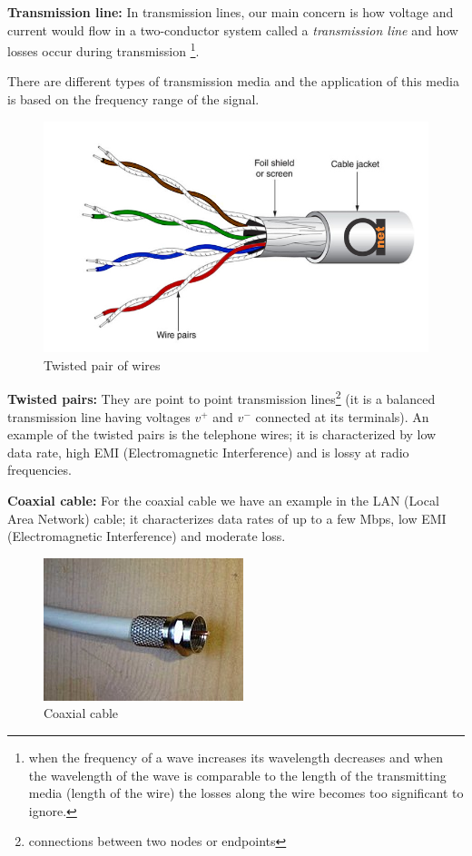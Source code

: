\textbf{Transmission line:} In transmission lines, our main concern is how voltage and current would flow in a two-conductor system called a \textit{transmission line} and how losses occur during transmission \footnote{when the frequency of a wave increases its wavelength decreases and when the wavelength of the wave is comparable to the length of the transmitting media (length of the wire) the losses along the wire becomes too significant to ignore.}.

There are different types of transmission media and the application of this media is based on the frequency range of the signal. \begin{figure}[h]
\centering
\includegraphics[width=1\linewidth]{./graphics/twistedpairs}
\caption{Twisted pair of wires}
\end{figure} 

\textbf{Twisted pairs:} They are point to point transmission lines\footnote{connections between two nodes or endpoints} (it is a balanced transmission line having voltages $v^{+}$ and $v^{-}$ connected at its terminals). An example of the twisted pairs is the telephone wires; it is characterized by low data rate, high EMI (Electromagnetic Interference) and is lossy at radio frequencies.

\textbf{Coaxial cable:} For the coaxial cable we have an example in the LAN (Local Area Network) cable; it characterizes data rates of up to a few Mbps, low EMI (Electromagnetic Interference) and moderate loss.
\begin{figure}[h]
\centering
\includegraphics[scale=0.4]{./graphics/coaxialcable}
\caption{Coaxial cable}
\end{figure}

